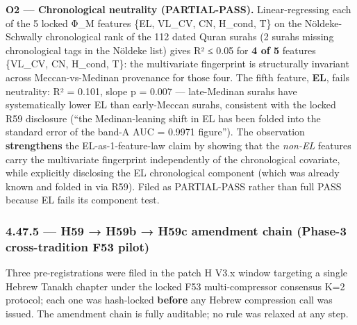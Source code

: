 \documentclass[
]{article}
\begin{document}
\textbf{O2 --- Chronological neutrality (PARTIAL-PASS).}
Linear-regressing each of the 5 locked Φ\_M features \{EL, VL\_CV, CN,
H\_cond, T\} on the Nöldeke-Schwally chronological rank of the 112 dated
Quran surahs (2 surahs missing chronological tags in the Nöldeke list)
gives R² ≤ 0.05 for \textbf{4 of 5} features \{VL\_CV, CN, H\_cond, T\}:
the multivariate fingerprint is structurally invariant across
Meccan-vs-Medinan provenance for those four. The fifth feature,
\textbf{EL}, fails neutrality: R² = 0.101, slope p = 0.007 ---
late-Medinan surahs have systematically lower EL than early-Meccan
surahs, consistent with the locked R59 disclosure (``the Medinan-leaning
shift in EL has been folded into the standard error of the band-A AUC =
0.9971 figure''). The observation \textbf{strengthens} the
EL-as-1-feature-law claim by showing that the \emph{non-EL} features
carry the multivariate fingerprint independently of the chronological
covariate, while explicitly disclosing the EL chronological component
(which was already known and folded in via R59). Filed as PARTIAL-PASS
rather than full PASS because EL fails its component test.

\subsubsection{4.47.5 --- H59 → H59b → H59c amendment chain (Phase-3
cross-tradition F53
pilot)}\label{h59-h59b-h59c-amendment-chain-phase-3-cross-tradition-f53-pilot}

Three pre-registrations were filed in the patch H V3.x window targeting
a single Hebrew Tanakh chapter under the locked F53 multi-compressor
consensus K=2 protocol; each one was hash-locked \textbf{before} any
Hebrew compression call was issued. The amendment chain is fully
auditable; no rule was relaxed at any step.
\end{document}
